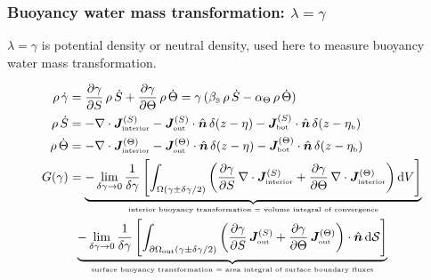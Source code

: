 \documentclass[10pt]{beamer}
\begin{document}
\begin{frame}
  \frametitle{Buoyancy water mass transformation: $\lambda = \gamma$}


\scriptsize 
$\lambda = \gamma$ is potential density or neutral density, used here to measure buoyancy water mass transformation.   

\tiny  
\begin{align*}
  \rho \, \dot{\gamma} &= 
  \frac{\partial \gamma}{\partial S} \, \rho \, \dot{S}
 +
  \frac{\partial \gamma}{\partial \Theta} \, \rho \, \dot{\Theta}
 =
 \gamma \, ( \beta_{\mbox{\tiny S}} \, \rho \, \dot{S} - \alpha_{\Theta} \, \rho \, \dot{\Theta})
\\
   \rho \, \dot{S} &= 
   - \nabla \cdot {\bm J}^{(S)}_{\mbox{\tiny interior}} 
   - {\bm J}^{(S)}_{\mbox{\tiny out}} \cdot \hat{\bm n} \, \delta(z-\eta)
   - {\bm J}^{(S)}_{\mbox{\tiny bot}} \cdot \hat{\bm n} \, \delta(z-\eta_{\mbox{\tiny b}})
 \\
  \rho \, \dot{\Theta} &= 
    -\nabla \cdot {\bm J}^{(\Theta)}_{\mbox{\tiny interior}} 
    - {\bm J}^{(\Theta)}_{\mbox{\tiny out}} \cdot \hat{\bm n} \, \delta(z-\eta)
   - {\bm J}^{(\Theta)}_{\mbox{\tiny bot}} \cdot \hat{\bm n} \, \delta(z-\eta_{\mbox{\tiny b}} )
\\
 G(\gamma) &= 
 \underbrace{
  -\lim_{\delta \gamma \rightarrow 0}
 \frac{1}{\delta \gamma}
 \left[ \int_{\Omega(\gamma \pm \delta \gamma/2)} 
  \left(\frac{\partial \gamma}{\partial S} \, \nabla \cdot {\bm J}^{(S)}_{\mbox{\tiny interior}} 
 +\frac{\partial \gamma}{\partial \Theta} \, \nabla \cdot {\bm J}^{(\Theta)}_{\mbox{\tiny interior}} 
  \right)
  \mathrm{d}V
  \right]
  }_{\mbox{\tiny interior buoyancy transformation = volume integral of convergence}}
\nonumber 
 \\
  & \; \; 
 \underbrace{
  -\lim_{\delta \gamma \rightarrow 0}
 \frac{1}{\delta \gamma}
 \left[ \int_{\partial \Omega_{\mbox{\tiny out}} (\gamma \pm \delta \gamma/2)} 
 \left(  \frac{\partial \gamma}{\partial S} \, {\bm J}^{(S)}_{\mbox{\tiny out}}  
     +   \frac{\partial \gamma}{\partial \Theta} \, {\bm J}^{(\Theta)}_{\mbox{\tiny out}}  
  \right)
  \cdot \hat{\bm n} \, \mathrm{d}\mathcal{S}
  \right]
 }_{\mbox{\tiny surface buoyancy transformation = area integral of surface boundary fluxes}}
\nonumber 

\end{align*}
\end{frame}
\end{document}
